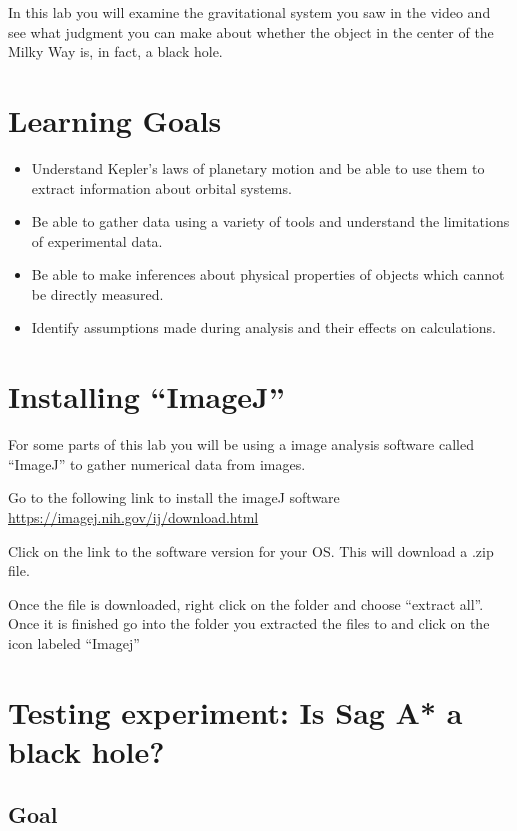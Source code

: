 In this lab you will examine the gravitational system you saw in the video and see what judgment you can make about whether the object in the center of the Milky Way is, in fact, a black hole.%

\section{Learning Goals}
\begin{itemize}
	\item Understand Kepler's laws of planetary motion and be able to use them to extract information about orbital systems.
	\item Be able to gather data using a variety of tools and understand the limitations of experimental data.
	\item Be able to make inferences about physical properties of objects which cannot be directly measured.
	\item Identify assumptions made during analysis and their effects on calculations.
\end{itemize}

\section{Installing ``ImageJ''}
For some parts of this lab you will be using a image analysis software called ``ImageJ'' to gather numerical data from images.
\begin{steps}
	\item Go to the following link to install the imageJ software \url{https://imagej.nih.gov/ij/download.html}
	\item Click on the link to the software version for your OS. This will download a .zip file.
	\item Once the file is downloaded, right click on the folder and choose ``extract all''. Once it is finished go into the folder you extracted the files to and click on the icon labeled ``Imagej''
\end{steps}

\section{Testing experiment: Is Sag A* a black hole?}

\subsection{Goal}


